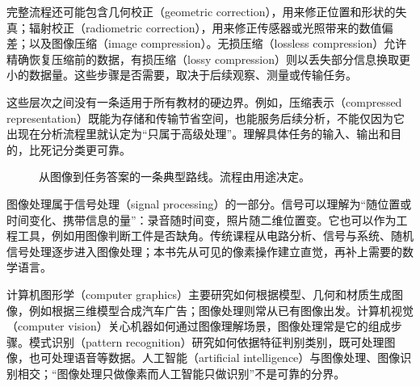 完整流程还可能包含几何校正（geometric correction），用来修正位置和形状的失真；辐射校正（radiometric correction），用来修正传感器或光照带来的数值偏差；以及图像压缩（image compression）。无损压缩（lossless compression）允许精确恢复压缩前的数据，有损压缩（lossy compression）则以丢失部分信息换取更小的数据量。这些步骤是否需要，取决于后续观察、测量或传输任务。

这些层次之间没有一条适用于所有教材的硬边界。例如，压缩表示（compressed representation）既能为存储和传输节省空间，也能服务后续分析，不能仅因为它出现在分析流程里就认定为“只属于高级处理”。理解具体任务的输入、输出和目的，比死记分类更可靠。

\begin{figure}[htbp]
\centering
{}
\caption{从图像到任务答案的一条典型路线。流程由用途决定。}
\end{figure}

图像处理属于信号处理（signal processing）的一部分。信号可以理解为“随位置或时间变化、携带信息的量”：录音随时间变，照片随二维位置变。它也可以作为工程工具，例如用图像判断工件是否缺角。传统课程从电路分析、信号与系统、随机信号处理逐步进入图像处理；本书先从可见的像素操作建立直觉，再补上需要的数学语言。

计算机图形学（computer graphics）主要研究如何根据模型、几何和材质生成图像，例如根据三维模型合成汽车广告；图像处理则常从已有图像出发。计算机视觉（computer vision）关心机器如何通过图像理解场景，图像处理常是它的组成步骤。模式识别（pattern recognition）研究如何依据特征判别类别，既可处理图像，也可处理语音等数据。人工智能（artificial intelligence）与图像处理、图像识别相交；“图像处理只做像素而人工智能只做识别”不是可靠的分界。

